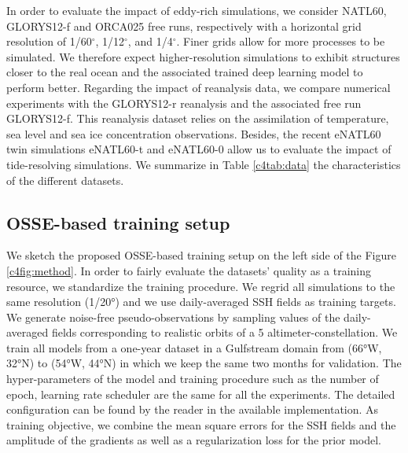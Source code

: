 \begin{bibunit}
In order to evaluate the impact of eddy-rich simulations, we consider NATL60, GLORYS12-f and ORCA025 free runs, respectively with a horizontal grid resolution of 1/60$^\circ$, 1/12$^\circ$, and 1/4$^\circ$. Finer grids allow for more processes to be simulated. We therefore expect higher-resolution simulations to exhibit structures closer to the real ocean and the associated trained deep learning model to perform better.
Regarding the impact of reanalysis data, we compare numerical experiments with the GLORYS12-r reanalysis and the associated free run GLORYS12-f. This reanalysis dataset relies on the assimilation of temperature, sea level and sea ice concentration observations. 
Besides, the recent eNATL60 twin simulations eNATL60-t and eNATL60-0 allow us to evaluate the impact of tide-resolving simulations.
We summarize in Table \ref{c4tab:data} the characteristics of the different datasets. 

\subsection{OSSE-based training setup}
\label{c4ssec:training}
We sketch the proposed OSSE-based training setup on the left side of the Figure \ref{c4fig:method}.
In order to fairly evaluate the datasets' quality as a training resource, we standardize the training procedure.
We regrid all simulations to the same resolution (1/20°) and we use daily-averaged SSH fields as training targets. We generate noise-free pseudo-observations by sampling values of the daily-averaged fields corresponding to realistic orbits of a 5 altimeter-constellation. We train all models from a one-year dataset in a Gulfstream domain from (66°W, 32°N) to (54°W, 44°N) in which we keep the same two months for validation. The hyper-parameters of the model and training procedure such as the number of epoch, learning rate scheduler are the same for all the experiments. The detailed configuration can be found by the reader in the available implementation. As training objective, we combine the mean square errors for the SSH fields and the amplitude of the gradients as well as a regularization loss for the prior model.


\end{bibunit}
